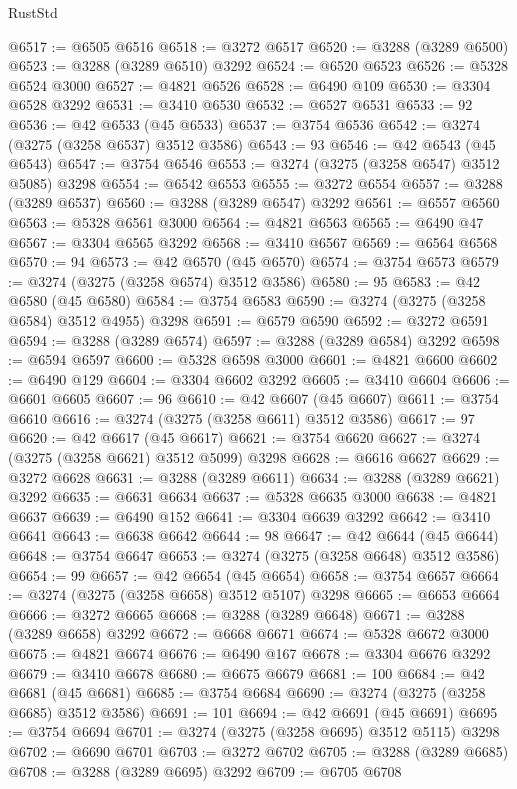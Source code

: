 \begin{lexlean}{RustStd}
\begin{coremodule}
@6517 := @6505 @6516
@6518 := @3272 @6517
@6520 := @3288 (@3289 @6500)
@6523 := @3288 (@3289 @6510) @3292
@6524 := @6520 @6523
@6526 := @5328 @6524 @3000
@6527 := @4821 @6526
@6528 := @6490 @109
@6530 := @3304 @6528 @3292
@6531 := @3410 @6530
@6532 := @6527 @6531
@6533 := 92
@6536 := @42 @6533 (@45 @6533)
@6537 := @3754 @6536
@6542 := @3274 (@3275 (@3258 @6537) @3512 @3586)
@6543 := 93
@6546 := @42 @6543 (@45 @6543)
@6547 := @3754 @6546
@6553 := @3274 (@3275 (@3258 @6547) @3512 @5085) @3298
@6554 := @6542 @6553
@6555 := @3272 @6554
@6557 := @3288 (@3289 @6537)
@6560 := @3288 (@3289 @6547) @3292
@6561 := @6557 @6560
@6563 := @5328 @6561 @3000
@6564 := @4821 @6563
@6565 := @6490 @47
@6567 := @3304 @6565 @3292
@6568 := @3410 @6567
@6569 := @6564 @6568
@6570 := 94
@6573 := @42 @6570 (@45 @6570)
@6574 := @3754 @6573
@6579 := @3274 (@3275 (@3258 @6574) @3512 @3586)
@6580 := 95
@6583 := @42 @6580 (@45 @6580)
@6584 := @3754 @6583
@6590 := @3274 (@3275 (@3258 @6584) @3512 @4955) @3298
@6591 := @6579 @6590
@6592 := @3272 @6591
@6594 := @3288 (@3289 @6574)
@6597 := @3288 (@3289 @6584) @3292
@6598 := @6594 @6597
@6600 := @5328 @6598 @3000
@6601 := @4821 @6600
@6602 := @6490 @129
@6604 := @3304 @6602 @3292
@6605 := @3410 @6604
@6606 := @6601 @6605
@6607 := 96
@6610 := @42 @6607 (@45 @6607)
@6611 := @3754 @6610
@6616 := @3274 (@3275 (@3258 @6611) @3512 @3586)
@6617 := 97
@6620 := @42 @6617 (@45 @6617)
@6621 := @3754 @6620
@6627 := @3274 (@3275 (@3258 @6621) @3512 @5099) @3298
@6628 := @6616 @6627
@6629 := @3272 @6628
@6631 := @3288 (@3289 @6611)
@6634 := @3288 (@3289 @6621) @3292
@6635 := @6631 @6634
@6637 := @5328 @6635 @3000
@6638 := @4821 @6637
@6639 := @6490 @152
@6641 := @3304 @6639 @3292
@6642 := @3410 @6641
@6643 := @6638 @6642
@6644 := 98
@6647 := @42 @6644 (@45 @6644)
@6648 := @3754 @6647
@6653 := @3274 (@3275 (@3258 @6648) @3512 @3586)
@6654 := 99
@6657 := @42 @6654 (@45 @6654)
@6658 := @3754 @6657
@6664 := @3274 (@3275 (@3258 @6658) @3512 @5107) @3298
@6665 := @6653 @6664
@6666 := @3272 @6665
@6668 := @3288 (@3289 @6648)
@6671 := @3288 (@3289 @6658) @3292
@6672 := @6668 @6671
@6674 := @5328 @6672 @3000
@6675 := @4821 @6674
@6676 := @6490 @167
@6678 := @3304 @6676 @3292
@6679 := @3410 @6678
@6680 := @6675 @6679
@6681 := 100
@6684 := @42 @6681 (@45 @6681)
@6685 := @3754 @6684
@6690 := @3274 (@3275 (@3258 @6685) @3512 @3586)
@6691 := 101
@6694 := @42 @6691 (@45 @6691)
@6695 := @3754 @6694
@6701 := @3274 (@3275 (@3258 @6695) @3512 @5115) @3298
@6702 := @6690 @6701
@6703 := @3272 @6702
@6705 := @3288 (@3289 @6685)
@6708 := @3288 (@3289 @6695) @3292
@6709 := @6705 @6708

\end{coremodule}
\end{lexlean}
